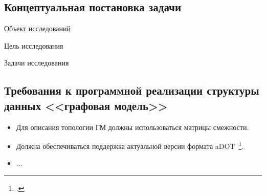 \subsection{Концептуальная постановка задачи}
\begin{frame}%

\begin{block}{Объект исследований}
\textexample{\ObjectOfResearch}
\end{block}

\begin{block}{Цель исследования}
\textexample{\GoalOfResearch}
\end{block}

\begin{block}{Задачи исследования}
\begin{enumerate}
\end{enumerate}
\end{block}

\end{frame}

\subsection{Требования к программной реализации структуры данных <<графовая модель>>}
\begin{frame}%

\begin{itemize}
	\item Для описания топологии ГМ должны использоваться матрицы смежности. 
	\item Должна обеспечиваться поддержка актуальной версии формата aDOT~\footcite{SokADOT}.
	\item ...
\end{itemize}

\end{frame}
